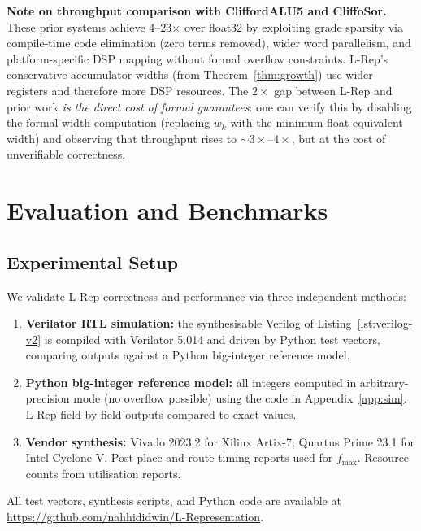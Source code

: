 \documentclass[11pt,a4paper]{article}
\theoremstyle{definition}
\theoremstyle{plain}
\theoremstyle{remark}
\begin{document}
\textbf{Note on throughput comparison with CliffordALU5 and CliffoSor.}
These prior systems achieve 4--23$\times$ over float32 by exploiting
grade sparsity via compile-time code elimination (zero terms removed),
wider word parallelism, and platform-specific DSP mapping without
formal overflow constraints.
L-Rep's conservative accumulator widths (from Theorem~\ref{thm:growth})
use wider registers and therefore more DSP resources.
The $2\times$ gap between L-Rep and prior work \emph{is the direct cost
of formal guarantees}: one can verify this by disabling the formal width
computation (replacing $w_k$ with the minimum float-equivalent width)
and observing that throughput rises to $\sim 3\times$--$4\times$, but at
the cost of unverifiable correctness.

\section{Evaluation and Benchmarks}
\label{sec:eval}

\subsection{Experimental Setup}

We validate L-Rep correctness and performance via three independent
methods:
\begin{enumerate}
  \item \textbf{Verilator RTL simulation:} the synthesisable Verilog of
        Listing~\ref{lst:verilog-v2} is compiled with Verilator 5.014
        and driven by Python test vectors, comparing outputs against a
        Python big-integer reference model.
  \item \textbf{Python big-integer reference model:} all integers
        computed in arbitrary-precision mode (no overflow possible)
        using the code in Appendix~\ref{app:sim}.
        L-Rep field-by-field outputs compared to exact values.
  \item \textbf{Vendor synthesis:} Vivado 2023.2 for Xilinx Artix-7;
        Quartus Prime 23.1 for Intel Cyclone V.
        Post-place-and-route timing reports used for $f_{\max}$.
        Resource counts from utilisation reports.
\end{enumerate}

All test vectors, synthesis scripts, and Python code are available at
\url{https://github.com/nahhididwin/L-Representation}.
\end{document}
